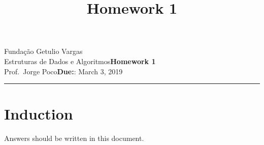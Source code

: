 \documentclass{article}
\title{Homework 1}
\date{}
\newcommand{\assignment}{Homework 1}
\newcommand{\duedate}{March 3, 2019}
\begin{document}
Fundação Getulio Vargas\hfill\\
Estruturas de Dados e Algoritmos\hfill\textbf{\assignment}\\
Prof.\ Jorge Poco\hfill\textbf{Due:}: \duedate\\
\smallskip\hrule\bigskip

{\let\newpage\relax\maketitle}
\maketitle


\section{Induction}
Answers should be written in this document. 
\end{document}
